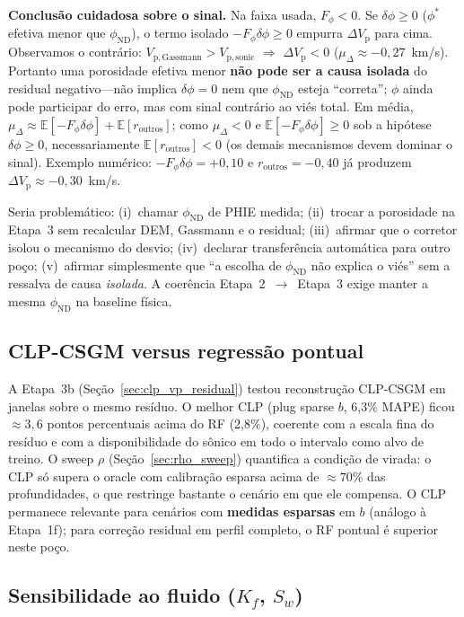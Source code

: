 \documentclass[11pt,a4paper]{article}
\numberwithin{equation}{section}
\newcommand{\phiND}{\ensuremath{\phi_{\mathrm{ND}}}}
\begin{document}
\textbf{Conclusão cuidadosa sobre o sinal.}
Na faixa usada, $F_\phi<0$. Se $\delta\phi\ge 0$
($\phi^{*}$ efetiva menor que \phiND{}), o termo isolado
$-F_\phi\delta\phi\ge 0$ empurra $\Delta V_{\mathrm{p}}$ para cima.
Observamos o contrário:
$V_{\mathrm{p,Gassmann}}>V_{\mathrm{p,sonic}}$
$\Rightarrow$ $\Delta V_{\mathrm{p}}<0$
($\mu_\Delta\approx -0{,}27$~km/s).
Portanto uma porosidade efetiva menor \textbf{não pode ser a causa isolada}
do residual negativo---não implica $\delta\phi=0$ nem que \phiND{} esteja
``correta''; $\phi$ ainda pode participar do erro, mas com sinal
contrário ao viés total.
Em média,
$\mu_\Delta
\approx\mathbb{E}[-F_\phi\delta\phi]+\mathbb{E}[r_{\mathrm{outros}}]$;
como $\mu_\Delta<0$ e $\mathbb{E}[-F_\phi\delta\phi]\ge 0$ sob a hipótese
$\delta\phi\ge 0$, necessariamente $\mathbb{E}[r_{\mathrm{outros}}]<0$
(os demais mecanismos devem dominar o sinal).
Exemplo numérico: $-F_\phi\delta\phi=+0{,}10$ e
$r_{\mathrm{outros}}=-0{,}40$ já produzem
$\Delta V_{\mathrm{p}}\approx -0{,}30$~km/s.

Seria problemático: (i)~chamar \phiND{} de PHIE medida; (ii)~trocar a
porosidade na Etapa~3 sem recalcular DEM, Gassmann e o residual;
(iii)~afirmar que o corretor isolou o mecanismo do desvio;
(iv)~declarar transferência automática para outro poço;
(v)~afirmar simplesmente que ``a escolha de \phiND{} não explica o viés''
sem a ressalva de causa \emph{isolada}.
A coerência Etapa~2~$\rightarrow$~Etapa~3 exige manter a mesma \phiND{} na
baseline física.

\subsection{CLP-CSGM versus regressão pontual}

A Etapa~3b (Seção~\ref{sec:clp_vp_residual}) testou reconstrução CLP-CSGM
em janelas sobre o mesmo resíduo.
O melhor CLP (plug sparse $b$, 6,3\% MAPE) ficou $\approx 3{,}6$ pontos
percentuais acima do RF (2,8\%), coerente com a escala fina do resíduo
e com a disponibilidade do sônico em todo o intervalo como alvo de treino.
O sweep $\rho$ (Seção~\ref{sec:rho_sweep}) quantifica a condição de virada:
o CLP só supera o oracle com calibração esparsa acima de $\approx 70\%$ das
profundidades, o que restringe bastante o cenário em que ele compensa.
O CLP permanece relevante para cenários com \textbf{medidas esparsas} em $b$
(análogo à Etapa~1f); para correção residual em perfil completo, o RF
pontual é superior neste poço.

\subsection{Sensibilidade ao fluido ($K_f$, $S_w$)}
\label{sec:kf_sensitivity}
\end{document}
